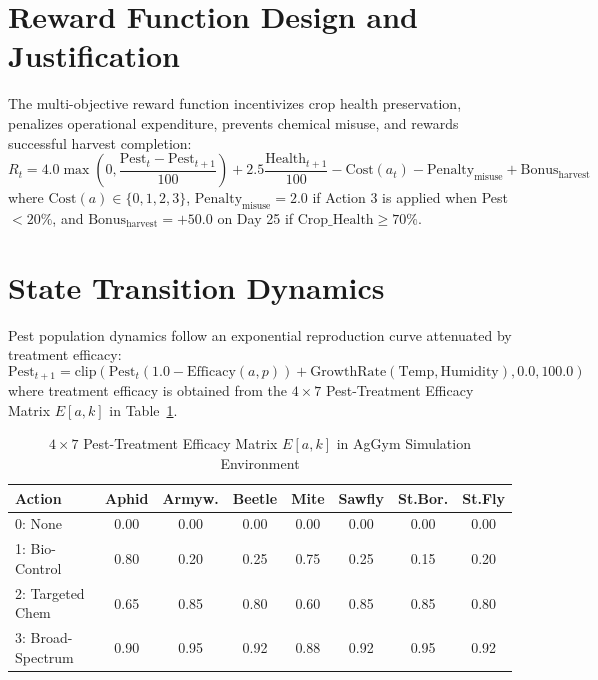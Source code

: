 \documentclass[12pt,a4paper]{report}
\begin{document}
\section{Reward Function Design and Justification}
The multi-objective reward function incentivizes crop health preservation, penalizes operational expenditure, prevents chemical misuse, and rewards successful harvest completion:
\begin{equation}
R_t = 4.0 \max\left(0, \frac{\text{Pest}_t - \text{Pest}_{t+1}}{100}\right) + 2.5 \frac{\text{Health}_{t+1}}{100} - \text{Cost}(a_t) - \text{Penalty}_{\text{misuse}} + \text{Bonus}_{\text{harvest}}
\end{equation}
where $\text{Cost}(a) \in \{0, 1, 2, 3\}$, $\text{Penalty}_{\text{misuse}} = 2.0$ if Action 3 is applied when Pest $< 20\%$, and $\text{Bonus}_{\text{harvest}} = +50.0$ on Day 25 if $\text{Crop\_Health} \ge 70\%$.

\section{State Transition Dynamics}
Pest population dynamics follow an exponential reproduction curve attenuated by treatment efficacy:
\begin{equation}
\text{Pest}_{t+1} = \text{clip}\left(\text{Pest}_t (1.0 - \text{Efficacy}(a, p)) + \text{GrowthRate}(\text{Temp}, \text{Humidity}), 0.0, 100.0\right)
\end{equation}
where treatment efficacy is obtained from the $4 \times 7$ Pest-Treatment Efficacy Matrix $E[a, k]$ in Table~\ref{tab:efficacy_matrix}.

\begin{table}[H]
\centering
\caption{$4 \times 7$ Pest-Treatment Efficacy Matrix $E[a, k]$ in AgGym Simulation Environment}
\label{tab:efficacy_matrix}
\begin{tabular}{lccccccc}
\toprule
\textbf{Action} & \textbf{Aphid} & \textbf{Armyw.} & \textbf{Beetle} & \textbf{Mite} & \textbf{Sawfly} & \textbf{St.Bor.} & \textbf{St.Fly} \\
\midrule
0: None & 0.00 & 0.00 & 0.00 & 0.00 & 0.00 & 0.00 & 0.00 \\
1: Bio-Control & 0.80 & 0.20 & 0.25 & 0.75 & 0.25 & 0.15 & 0.20 \\
2: Targeted Chem & 0.65 & 0.85 & 0.80 & 0.60 & 0.85 & 0.85 & 0.80 \\
3: Broad-Spectrum & 0.90 & 0.95 & 0.92 & 0.88 & 0.92 & 0.95 & 0.92 \\
\bottomrule
\end{tabular}
\end{table}
\end{document}
